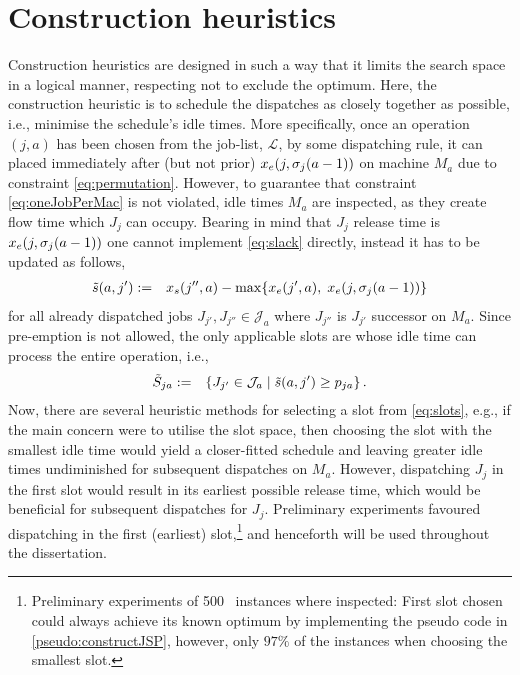\section{Construction heuristics}\label{sec:CH}
Construction heuristics are designed in such a way that it limits the search 
space in a logical manner, respecting not to exclude the optimum. Here, the 
construction heuristic is to schedule the dispatches as closely together as 
possible, i.e., minimise the schedule's idle times. 
More specifically, once an operation $(j,a)$ has been chosen from the job-list, 
$\mathcal{L}$, by some dispatching rule, it can placed immediately after (but 
not prior) $x_e(j,{\mathbf{\sigma}}_j(a-1))$ on machine $M_a$ due to constraint 
\cref{eq:permutation}. 
However, to guarantee that constraint \cref{eq:oneJobPerMac} is not violated, 
idle times $M_a$ are inspected, as they create flow time  which $J_j$ can 
occupy. Bearing in mind that $J_j$ release time is $x_e(j,{\mathbf{\sigma}}_j(a-1))$ one 
cannot implement \cref{eq:slack} directly, instead it has to be updated as 
follows,
\begin{eqnarray}
	\tilde{s}(a,j')&:=& x_s(j'',a)-\max\{x_e(j',a),\;x_e(j,\vsigma_j(a-1))\} %
\end{eqnarray}
for all already dispatched jobs $J_{j'},J_{j''}\in \mathcal{J}_a$ where $J_{j''}$ is $J_{j'}$ successor on $M_a$. Since pre-emption is not allowed, the only applicable slots are whose idle time can process the entire operation, i.e.,
\begin{eqnarray}
	\tilde{S}_{ja}&:=&\condset{J_{j'}\in \mathcal{J}_a}{\tilde{s}(a,j')\geq 
	p_{ja} }\label{eq:slots}.
\end{eqnarray} 
Now, there are several heuristic methods for selecting a slot from 
\cref{eq:slots}, e.g., if the main concern were to utilise the slot space, then 
choosing the slot with the smallest idle time would yield a closer-fitted 
schedule and leaving greater idle times undiminished for subsequent dispatches 
on $M_a$. However, dispatching $J_j$ in the first slot would result in its 
earliest possible release time, which would be beneficial for subsequent 
dispatches for $J_j$. Preliminary experiments favoured dispatching in the first 
(earliest) slot,\footnote{Preliminary experiments of 500 \JSP\ instances where 
inspected: First slot chosen could always achieve its known optimum by 
implementing the pseudo code in \cref{pseudo:constructJSP}, however, only 
$97\%$ of the instances when choosing the smallest slot.} and henceforth will 
be used throughout the dissertation.


